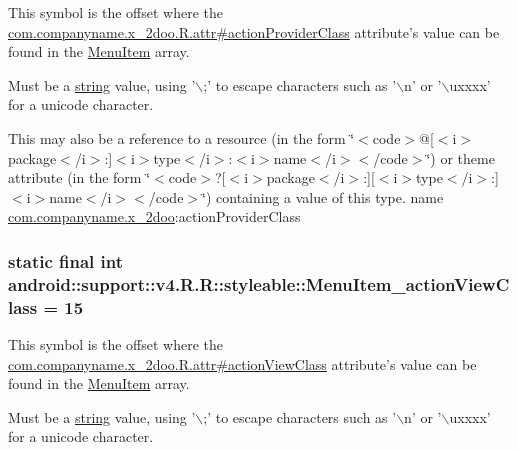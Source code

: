 This symbol is the offset where the \hyperlink{classcom_1_1companyname_1_1x__2doo_1_1_r_1_1attr_6f2995e817a9115a888ff40dda700af2}{com.companyname.x\_\-2doo.R.attr\#actionProviderClass} attribute's value can be found in the \hyperlink{classandroid_1_1support_1_1v4_1_1_r_1_1styleable_05493a7eeaa2bff09c4fbacbfb671ccc}{MenuItem} array.

Must be a \hyperlink{classandroid_1_1support_1_1v4_1_1_r_1_1string}{string} value, using '$\backslash$;' to escape characters such as '$\backslash$n' or '$\backslash$uxxxx' for a unicode character. 

This may also be a reference to a resource (in the form \char`\"{}$<$code$>$@\mbox{[}$<$i$>$package$<$/i$>$:\mbox{]}$<$i$>$type$<$/i$>$:$<$i$>$name$<$/i$>$$<$/code$>$\char`\"{}) or theme attribute (in the form \char`\"{}$<$code$>$?\mbox{[}$<$i$>$package$<$/i$>$:\mbox{]}\mbox{[}$<$i$>$type$<$/i$>$:\mbox{]}$<$i$>$name$<$/i$>$$<$/code$>$\char`\"{}) containing a value of this type.  name \hyperlink{namespacecom_1_1companyname_1_1x__2doo}{com.companyname.x\_\-2doo}:actionProviderClass \hypertarget{classandroid_1_1support_1_1v4_1_1_r_1_1styleable_540db8eb18bf4f5b4d829924f23cf3ef}{
\subsubsection[{MenuItem\_\-actionViewClass}]{\setlength{\rightskip}{0pt plus 5cm}static final int android::support::v4.R.R::styleable::MenuItem\_\-actionViewClass = 15}}
\label{classandroid_1_1support_1_1v4_1_1_r_1_1styleable_540db8eb18bf4f5b4d829924f23cf3ef}


This symbol is the offset where the \hyperlink{classcom_1_1companyname_1_1x__2doo_1_1_r_1_1attr_b577c791883e3126233013cc2268f77d}{com.companyname.x\_\-2doo.R.attr\#actionViewClass} attribute's value can be found in the \hyperlink{classandroid_1_1support_1_1v4_1_1_r_1_1styleable_05493a7eeaa2bff09c4fbacbfb671ccc}{MenuItem} array.

Must be a \hyperlink{classandroid_1_1support_1_1v4_1_1_r_1_1string}{string} value, using '$\backslash$;' to escape characters such as '$\backslash$n' or '$\backslash$uxxxx' for a unicode character. 

